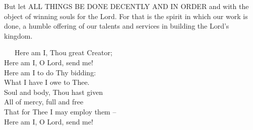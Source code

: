 \documentclass[
]{book}
\begin{document}
But let ALL THINGS BE DONE DECENTLY AND IN ORDER and with the object of winning souls for the Lord. For that is the spirit in which our work is done, a humble offering of our talents and services in building the Lord's kingdom.

~~~Here am I, Thou great Creator;\\
\hspace*{0.333em}\hspace*{0.333em}\hspace*{0.333em}Here am I, O Lord, send me!\\
\hspace*{0.333em}\hspace*{0.333em}\hspace*{0.333em}Here am I to do Thy bidding:\\
\hspace*{0.333em}\hspace*{0.333em}\hspace*{0.333em}What I have I owe to Thee.\\
\hspace*{0.333em}\hspace*{0.333em}\hspace*{0.333em}Soul and body, Thou hast given\\
\hspace*{0.333em}\hspace*{0.333em}\hspace*{0.333em}All of mercy, full and free\\
\hspace*{0.333em}\hspace*{0.333em}\hspace*{0.333em}That for Thee I may employ them --\\
\hspace*{0.333em}\hspace*{0.333em}\hspace*{0.333em}Here am I, O Lord, send me!
\end{document}
